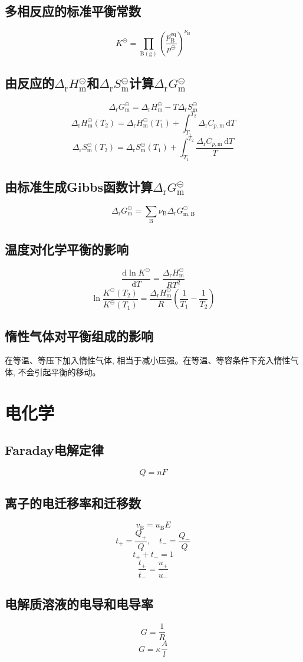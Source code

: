\documentclass[twocolumn]{article}
\newcommand{\equ}[1]{\begin{equation*}#1\end{equation*}}
\newcommand{\rmd}{\mathrm{d}}
\newcommand{\drgm}{\Delta_{\mathrm{r}}G_{\rmm}}
\newcommand{\drgmB}{\Delta_{\mathrm{r}}G_{\mathrm{m, B}}}
\newcommand{\drhm}{\Delta_{\mathrm{r}}H_{\rmm}}
\newcommand{\drsm}{\Delta_{\mathrm{r}}S_{\rmm}}
\newcommand{\eq}{^{\mathrm{eq}}}
\newcommand{\rmB}{\mathrm{B}}
\newcommand{\rmm}{\mathrm{m}}
\newcommand{\subB}{_{\rmB}}
\newcommand{\std}{^{\circleddash}}
\newcommand{\supnuB}{^{\nu\subB}}
\newcommand{\nuB}{\nu\subB}
\newcommand{\pstd}{p\std}
\newcommand{\xkh}[1]{\left(#1\right)}
\newcommand{\pf}{^{2}}
\renewcommand{\dfrac}[2]{\frac{\rmd #1}{\rmd #2}}
\begin{document}
\subsection{多相反应的标准平衡常数}
\equ{K\std=\prod_{\rmB \xkh{\mathrm{g}}}\xkh{\frac{p\subB\eq}{\pstd}}\supnuB}
\subsection{由反应的$\drhm\std$和$\drsm\std$计算$\drgm\std$}
\equ{\drgm\std=\drhm\std-T\drsm\std}
\equ{\drhm\std\xkh{T_{2}}=\drhm\std\xkh{T_{1}}+\int_{T_{1}}^{T_{2}}\Delta_{\mathrm{r}}C_{p, \rmm}\, \rmd T}
\equ{\drsm\std\xkh{T_{2}}=\drsm\std\xkh{T_{1}}+\int_{T_{1}}^{T_{2}}\frac{\Delta_{\mathrm{r}}C_{p, \rmm}\, \rmd T}{T}}
\subsection{由标准生成Gibbs函数计算$\drgm\std$}
\equ{\drgm\std=\sum\subB\nuB\drgmB\std}
\subsection{温度对化学平衡的影响}
\equ{\dfrac{\ln K\std}{T}=\frac{\drhm\std}{RT\pf}}
\equ{\ln\frac{K\std\xkh{T_{2}}}{K\std\xkh{T_{1}}}=\frac{\drhm\std}{R}\xkh{\frac{1}{T_{1}}-\frac{1}{T_{2}}}}
\subsection{惰性气体对平衡组成的影响}
在等温、等压下加入惰性气体, 相当于减小压强。在等温、等容条件下充入惰性气体, 不会引起平衡的移动。
\section{电化学}
\subsection{Faraday电解定律}
\equ{Q=nF}
\subsection{离子的电迁移率和迁移数}
\equ{v\subB=u\subB E}
\equ{t_{+}=\frac{Q_{+}}{Q}, \quad t_{-}=\frac{Q_{-}}{Q}}
\equ{t_{+}+t_{-}=1}
\equ{\frac{t_{+}}{t_{-}}=\frac{u_{+}}{u_{-}}}
\subsection{电解质溶液的电导和电导率}
\equ{G=\frac{1}{R}}
\equ{G=\kappa \frac{A}{l}}
\end{document}
